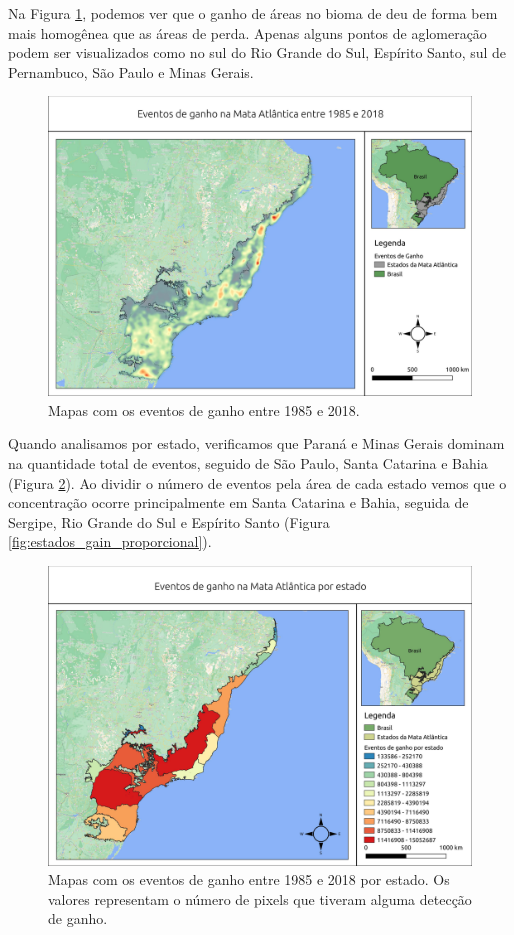 Na Figura \ref{fig:heat_gain}, podemos ver que o ganho de áreas no bioma de deu de forma bem mais homogênea que as áreas de perda. Apenas alguns pontos de aglomeração podem ser visualizados como no sul do Rio Grande do Sul, Espírito Santo, sul de Pernambuco, São Paulo e Minas Gerais.

\begin{figure}[H]
    \centering
    \includegraphics[scale=.5]{images/heatmap_gain_masked18_dur_gt4_inv_for.pdf}
    \caption{Mapas com os eventos de ganho entre 1985 e 2018.}
    \label{fig:heat_gain}
\end{figure}

Quando analisamos por estado, verificamos que Paraná e Minas Gerais dominam na quantidade total de eventos, seguido de São Paulo, Santa Catarina e Bahia (Figura \ref{fig:estados_gain}). Ao dividir o número de eventos pela área de cada estado vemos que o concentração ocorre principalmente em Santa Catarina e Bahia, seguida de Sergipe, Rio Grande do Sul e Espírito Santo (Figura \ref{fig:estados_gain_proporcional}).

\begin{figure}[H]
    \centering
    \includegraphics[scale=.5]{images/estados_gain_seg6_masked18_dur_gt4_inv_for.pdf}
    \caption{Mapas com os eventos de ganho entre 1985 e 2018 por estado. Os valores representam o número de pixels que tiveram alguma detecção de ganho.}
    \label{fig:estados_gain}
\end{figure}

